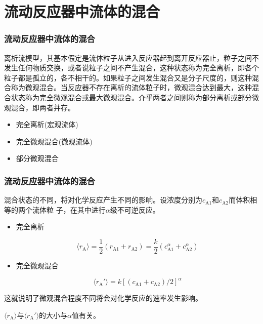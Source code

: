 \documentclass[dvipsnames, svgnames, x11names]{beamer}
\begin{document}
\section{流动反应器中流体的混合}


\begin{frame}
    \frametitle{流动反应器中流体的混合}

    离析流模型，其基本假定是流体粒子从进入反应器起到离开反应器止，粒子之间不发生任何物质交换，或者说粒子之间不产生混合，这种状态称为完全离析，即各个粒子都是孤立的，各不相干的。如果粒子之间发生混合又是分子尺度的，则这种混合称为微观混合。当反应器不存在离析的流体粒子时，微观混合达到最大，这种混合状态称为完全微观混合或最大微观混合。介乎两者之间则称为部分离析或部分微观混合，即两者并存。
    \begin{itemize}
        \item 完全离析(宏观流体)    
        \item 完全微观混合(微观流体)
        \item 部分微观混合
    \end{itemize}

\end{frame}


\begin{frame}
    \frametitle{流动反应器中流体的混合}

    混合状态的不同，将对化学反应产生不同的影响。设浓度分别为$c_\mathrm{A1}$和$c_\mathrm{A2}$而体积相等的两个流体粒
子，在其中进行$\alpha$级不可逆反应。
    \begin{itemize}
        \item 完全离析
        
        \[
            \langle r_\mathrm{A}\rangle  = \frac{1}{2}(r_\mathrm{A1} + r_\mathrm{A2}) = \frac{k}{2}(c_\mathrm{A1}^{\alpha} + c_\mathrm{A2}^{\alpha})
        \]
        \item 完全微观混合
        
        \[
            \langle r_\mathrm{A}' \rangle  = k[(c_\mathrm{A1} + c_\mathrm{A2})/2]^{\alpha}
        \]
    \end{itemize}
    这就说明了微观混合程度不同将会对化学反应的速率发生影响。
    
    $\langle r_\mathrm{A}\rangle$与$\langle r_\mathrm{A}' \rangle$的大小与$\alpha$值有关。

\end{frame}
\end{document}
